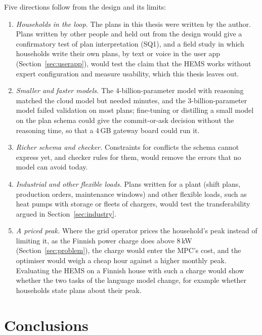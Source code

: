 \documentclass[12pt,a4paper]{report}
\begin{document}
Five directions follow from the design and its limits:

\begin{enumerate}
\item \textit{Households in the loop.} The plans in this thesis were
written by the author. Plans written by other people and held out from
the design would give a confirmatory test of plan interpretation (SQ1),
and a field study in which households write their own plans, by text or
voice in the user app (Section~\ref{sec:userapp}), would test the claim
that the HEMS works without expert configuration and measure usability,
which this thesis leaves out.
\item \textit{Smaller and faster models.} The 4-billion-parameter model
with reasoning matched the cloud model but needed minutes, and the
3-billion-parameter model failed validation on most plans; fine-tuning or distilling a small model on the
plan schema could give the commit-or-ask decision without the reasoning
time, so that a 4\,GB gateway board could run it.
\item \textit{Richer schema and checker.} Constraints for conflicts the
schema cannot express yet, and checker rules for them, would remove the
errors that no model can avoid today.
\item \textit{Industrial and other flexible loads.} Plans written for a
plant (shift plans, production orders, maintenance windows) and other
flexible loads, such as heat pumps with storage or fleets of chargers,
would test the transferability argued in Section~\ref{sec:industry}.
\item \textit{A priced peak.} Where the grid operator prices the
household's peak instead of limiting it, as the Finnish power charge
does above 8\,kW (Section~\ref{sec:problem}), the charge would enter
the MPC's cost, and the optimiser would weigh a cheap hour against a
higher monthly peak. Evaluating the HEMS on a Finnish house with such a
charge would show whether the two tasks of the language model change,
for example whether households state plans about their peak.
\end{enumerate}

\chapter{Conclusions}
\label{ch:conclusions}
\end{document}
